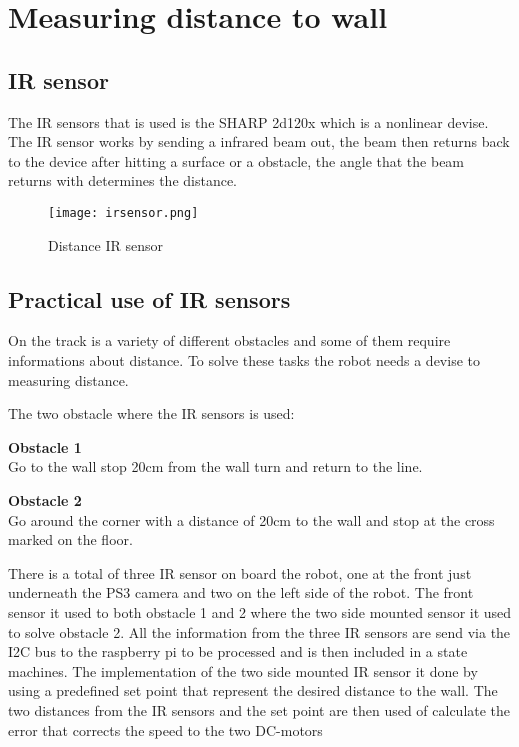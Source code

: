 \chapter{Measuring distance to wall}
\label{chap:wall_dist}

\section{IR sensor}
The IR sensors that is used is the SHARP 2d120x which is a nonlinear devise. The IR sensor works by sending a infrared beam out, the beam then returns  back to the device after hitting a surface or a obstacle, the angle that the beam returns with determines the distance. 
  \begin{figure}[!h!]
	\centering
	\texttt{[image: irsensor.png]}
	\caption{Distance IR sensor}
	\label{fig:3}
\end{figure}

\section{Practical use of IR sensors }
On the track is a variety of different obstacles and some of them require informations about distance. To solve these tasks the robot needs a devise to measuring distance. 

The two obstacle where the IR sensors is used:
\begin{itemize}
	\begin{item}
		\textbf{ Obstacle 1}\\ Go to the wall stop 20cm from the wall turn and return to the line.
	\end{item}
	
	\begin{item}
		\textbf{ Obstacle 2}\\Go around the corner with a distance of 20cm to the wall and stop at the cross marked on the floor. 
	\end{item}
\end{itemize}

There is a total of three IR sensor on board the robot, one at the front just underneath the PS3 camera and two on the left side of the robot. The front sensor it used to both obstacle 1 and 2 where the two side mounted sensor it used to solve obstacle 2. All the information from the three IR sensors are send via the I2C bus to the raspberry pi to be processed and is then included in a state machines.
The implementation of the two side mounted IR sensor it done by using a predefined set point that represent the desired distance to the wall. The two distances from the IR sensors and the set point are then used of calculate the error that corrects the speed to the two DC-motors

